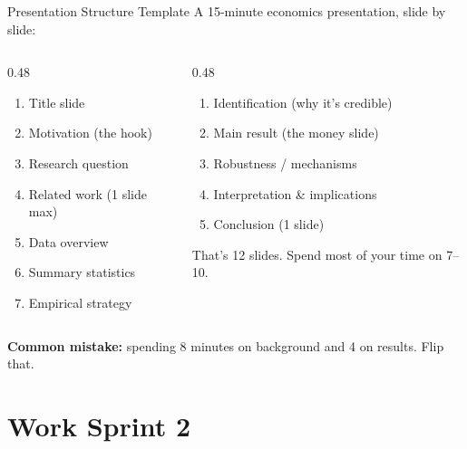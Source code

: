\begin{frame}{Presentation Structure Template}
  \footnotesize
  A 15-minute economics presentation, slide by slide:

  \vspace{2pt}

  \begin{columns}[T]
    \begin{column}{0.48\textwidth}
      \begin{enumerate}\setlength\itemsep{0pt}
        \item Title slide
        \item Motivation (the hook)
        \item Research question
        \item Related work (1 slide max)
        \item Data overview
        \item Summary statistics
        \item Empirical strategy
      \end{enumerate}
    \end{column}
    \begin{column}{0.48\textwidth}
      \begin{enumerate}\setlength\itemsep{0pt}
        \setcounter{enumi}{7}
        \item Identification (why it's credible)
        \item Main result (the money slide)
        \item Robustness / mechanisms
        \item Interpretation \& implications
        \item Conclusion (1 slide)
      \end{enumerate}

      \vspace{2pt}

      That's 12 slides. Spend most of your time on 7--10.
    \end{column}
  \end{columns}

  \vspace{4pt}

  \textbf{Common mistake:} spending 8 minutes on background and 4 on results. Flip that.
\end{frame}

\section{Work Sprint 2}

